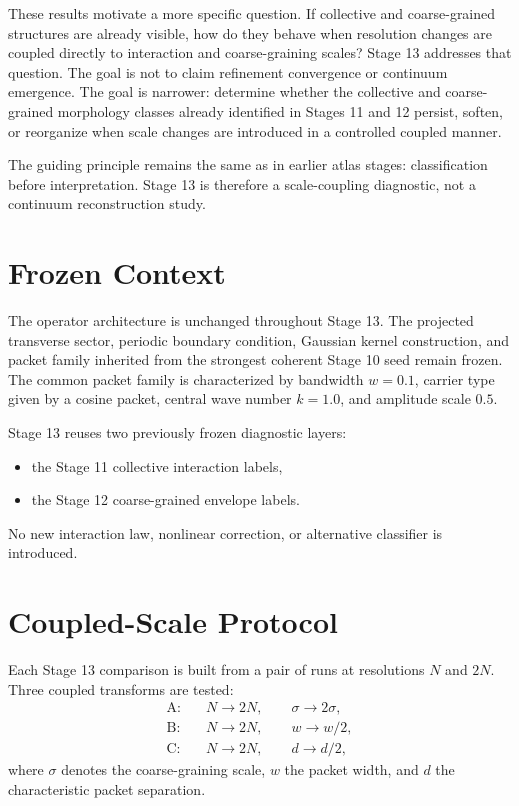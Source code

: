 \documentclass[11pt]{article}
\begin{document}
These results motivate a more specific question. If collective and coarse-grained structures are already visible, how do they behave when resolution changes are coupled directly to interaction and coarse-graining scales? Stage 13 addresses that question. The goal is not to claim refinement convergence or continuum emergence. The goal is narrower: determine whether the collective and coarse-grained morphology classes already identified in Stages 11 and 12 persist, soften, or reorganize when scale changes are introduced in a controlled coupled manner.

The guiding principle remains the same as in earlier atlas stages: classification before interpretation. Stage 13 is therefore a scale-coupling diagnostic, not a continuum reconstruction study.

\section{Frozen Context}

The operator architecture is unchanged throughout Stage 13. The projected transverse sector, periodic boundary condition, Gaussian kernel construction, and packet family inherited from the strongest coherent Stage 10 seed remain frozen. The common packet family is characterized by bandwidth $w=0.1$, carrier type given by a cosine packet, central wave number $k=1.0$, and amplitude scale $0.5$.

Stage 13 reuses two previously frozen diagnostic layers:
\begin{itemize}
\item the Stage 11 collective interaction labels,
\item the Stage 12 coarse-grained envelope labels.
\end{itemize}

No new interaction law, nonlinear correction, or alternative classifier is introduced.

\section{Coupled-Scale Protocol}

Each Stage 13 comparison is built from a pair of runs at resolutions $N$ and $2N$. Three coupled transforms are tested:
\begin{align}
\text{A}:& \quad N \rightarrow 2N, \qquad \sigma \rightarrow 2\sigma, \\
\text{B}:& \quad N \rightarrow 2N, \qquad w \rightarrow w/2, \\
\text{C}:& \quad N \rightarrow 2N, \qquad d \rightarrow d/2,
\end{align}
where $\sigma$ denotes the coarse-graining scale, $w$ the packet width, and $d$ the characteristic packet separation.
\end{document}
